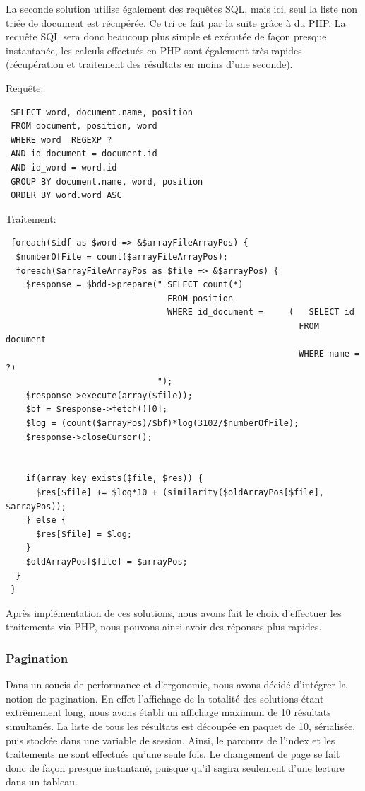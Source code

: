 \documentclass[11pt,a4paper]{article}
\begin{document}
La seconde solution utilise également des requêtes SQL, mais ici, seul la liste non triée de document est récupérée.
Ce tri ce fait par la suite grâce à du PHP. La requête SQL sera donc beaucoup plus simple et exécutée de façon presque instantanée, les calculs effectués en PHP sont également très rapides (récupération et traitement des résultats en moins d'une seconde).
\newline

Requête:
\begin{lstlisting}
 SELECT word, document.name, position
 FROM document, position, word
 WHERE word  REGEXP ?
 AND id_document = document.id
 AND id_word = word.id
 GROUP BY document.name, word, position
 ORDER BY word.word ASC
\end{lstlisting}

Traitement:

\begin{lstlisting}
 foreach($idf as $word => &$arrayFileArrayPos) {
  $numberOfFile = count($arrayFileArrayPos);
  foreach($arrayFileArrayPos as $file => &$arrayPos) {
    $response = $bdd->prepare(" SELECT count(*)
                                FROM position
                                WHERE id_document = 	(   SELECT id
                                                          FROM document
                                                          WHERE name = ?)
                              ");
    $response->execute(array($file));
    $bf = $response->fetch()[0];
    $log = (count($arrayPos)/$bf)*log(3102/$numberOfFile);
    $response->closeCursor();


    if(array_key_exists($file, $res)) {
      $res[$file] += $log*10 + (similarity($oldArrayPos[$file], $arrayPos));
    } else {
      $res[$file] = $log;
    }
    $oldArrayPos[$file] = $arrayPos;
  }
 }
\end{lstlisting}


Après implémentation de ces solutions, nous avons fait le choix d'effectuer les traitements via PHP, nous pouvons ainsi avoir des réponses plus rapides.

\subsubsection{Pagination}

Dans un soucis de performance et d'ergonomie, nous avons décidé d'intégrer la notion de pagination.
En effet l'affichage de la totalité des solutions étant extrêmement long, nous avons établi un affichage maximum de 10 résultats simultanés. La liste de tous les résultats est découpée en paquet de 10, sérialisée, puis stockée dans une variable de session.
Ainsi, le parcours de l'index et les traitements ne sont effectués qu'une seule fois. 
Le changement de page se fait donc de façon presque instantané, puisque qu'il sagira seulement d'une lecture dans un tableau.
\end{document}
